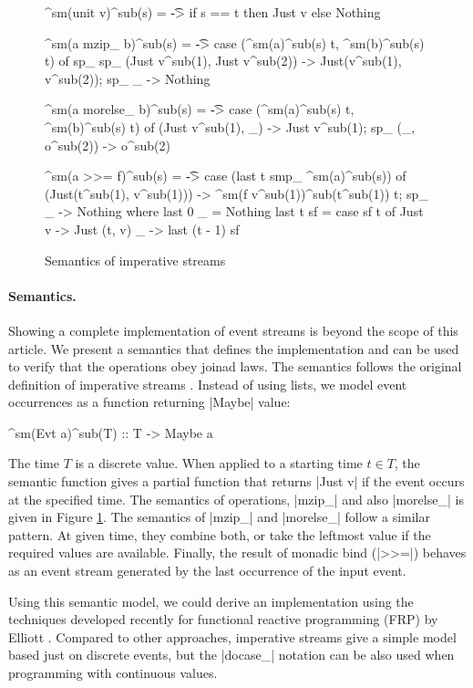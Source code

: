 \documentclass{sigplanconf}
\begin{document}
\begin{figure}
\begin{code}
^sm(unit v)^sub(s)        = \t -> if s == t then Just v else Nothing

^sm(a mzip_ b)^sub(s)     = \t -> case (^sm(a)^sub(s) t, ^sm(b)^sub(s) t) of
  sp_ sp_  (Just v^sub(1), Just v^sub(2)) -> Just(v^sub(1), v^sub(2)); sp_ _ -> Nothing

^sm(a morelse_ b)^sub(s)  = \t -> case (^sm(a)^sub(s) t, ^sm(b)^sub(s) t) of
           (Just v^sub(1), _) -> Just v^sub(1); sp_ (_, o^sub(2)) -> o^sub(2)

^sm(a >>= f)^sub(s)       = \t -> case (last t smp_ ^sm(a)^sub(s)) of
           (Just(t^sub(1), v^sub(1))) -> ^sm(f v^sub(1))^sub(t^sub(1)) t; sp_ _ -> Nothing
  where  last 0 _   = Nothing
         last t sf  = case sf t of  Just v -> Just (t, v)
                                    _ -> last (t - 1) sf
\end{code}
\caption{Semantics of imperative streams}
\label{fig:imperativestream-semantics}
\end{figure}

\paragraph{Semantics.} Showing a complete implementation of event streams is beyond the scope of
this article. We present a semantics that defines the implementation and can be used to verify 
that the operations obey joinad laws. The semantics follows the original definition of imperative 
streams \cite{imperative-streams}. Instead of using lists, we model event occurrences as a 
function returning |Maybe| value:

\begin{code}
^sm(Evt a)^sub(T) :: T -> Maybe a
\end{code}
The time $T$ is a discrete value. When applied to a starting time $t \in T$, the semantic function 
gives a partial function that returns |Just v| if the event occurs at the specified time.
The semantics of  operations, |mzip_| and also |morelse_| is given in 
Figure \ref{fig:imperativestream-semantics}.
The semantics of |mzip_| and |morelse_| follow a similar pattern. At given time, they combine 
both, or take the leftmost value if the required values are available. Finally, the result of monadic
bind (|>>=|) behaves as an event stream generated by the last occurrence of the input event.

Using this semantic model, we could derive an implementation using the techniques developed recently 
for functional reactive programming (FRP) by Elliott \cite{push-pull-frp}. Compared to other 
approaches, imperative streams give a simple model based just on discrete events, but the |docase_|
notation can be also used when programming with continuous values.
\end{document}
